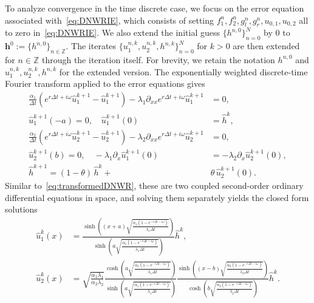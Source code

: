 \documentclass[reqno]{amsart}
\begin{document}
To analyze convergence in the time discrete case, we focus on the error equation associated with~\eqref{eq:DNWRIE}, which consists of setting $f_1^n, f_2^n, g_l^n, g_r^n, u_{0, 1}, u_{0, 2}$ all to zero in~\eqref{eq:DNWRIE}. We also extend the initial guess $\{h^{n, 0}\}_{n=0}^{N}$ by 0 to $\boldsymbol{h}^0 :=\{h^{n,0}\}_{n\in\mathbb{Z}}$. The iterates $\{u_1^{n, k}, u_2^{n, k}, h^{n, k}\}_{n=0}^N$ for $k>0$ are then extended for $n\in\mathbb{Z}$ through the iteration itself. For brevity, we retain the notation $h^{n, 0}$ and $u_1^{n, k}, u_2^{n, k}, h^{n, k}$ for the extended version. 
The exponentially weighted discrete-time Fourier transform applied to the error equations gives
\begin{equation}\label{eq:transformedDNWRIE}
\begin{aligned}
	\frac{\alpha_1}{\Delta t} (e^{r \Delta t + i \omega} \widehat u^{k+1}_1 - \widehat u^{k+1}_1) - \lambda_1  \partial_{xx} e^{r \Delta t + i \omega} \widehat u^{k+1}_1 &= 0, \\
	\widehat u^{k+1}_1(-a) = 0, \quad
	\widehat u^{k+1}_1(0) &= \widehat h^k, \\
	\frac{\alpha_2}{\Delta t} (e^{r \Delta t + i \omega} \widehat u_2^{k+1} - \widehat u_2^{k+1}) - \lambda_2  \partial_{xx} e^{r \Delta t + i \omega} \widehat u_2^{k+1} &= 0, \\
	\widehat u^{k+1}_2(b) = 0, \quad
	-\lambda_1 \partial_x \widehat u^{k+1}_1(0) &= -\lambda_2 \partial_x \widehat u^{k+1}_2(0), \\
	\widehat h^{k+1} = (1 - \theta)\,\widehat h^{k} + &\theta\,\widehat u^{k+1}_2(0).
\end{aligned}
\end{equation}
Similar to~\eqref{eq:transformedDNWR}, these are two coupled second-order ordinary differential equations in space, and solving them separately yields the closed form solutions
\[\begin{aligned}
	\widehat u_1^k(x) &= \frac{\sinh\left((x+a)\sqrt{\frac{\alpha_1(1-e^{-r \Delta t - i\omega})}{\lambda_1\Delta t}}\right)}{\sinh\left(a\sqrt{\frac{\alpha_1(1-e^{-r \Delta t -i \omega})}{\lambda_1\Delta t}}\right)} \widehat h^k, \\
	\widehat u_2^k(x) &= \sqrt{\frac{\alpha_1\lambda_1}{\alpha_2\lambda_2}}\frac{\cosh\left(a\sqrt{\frac{\alpha_1(1-e^{-r \Delta t -i \omega})}{\lambda_1\Delta t}}\right)}{\sinh\left(a\sqrt{\frac{\alpha_1(1-e^{-r \Delta t -i \omega})}{\lambda_1\Delta t}}\right)}\frac{\sinh\left((x-b)\sqrt{\frac{\alpha_2(1-e^{-r \Delta t -i \omega})}{\lambda_2\Delta t}}\right)}{\cosh\left(b\sqrt{\frac{\alpha_2(1-e^{-r \Delta t -i \omega})}{\lambda_2\Delta t}}\right)} \widehat h^k.
\end{aligned}\]
\end{document}
